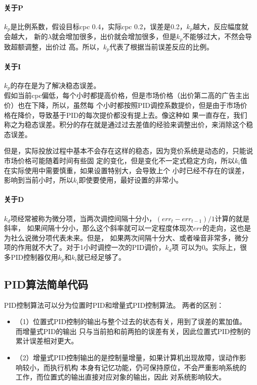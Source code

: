\paragraph{关于P}
$k_{p}$是比例系数，假设目标cpc 0.4，实际cpc 0.2，误差是0.2，$k_{p}$越大，反应幅度就会越大，
新的$\lambda$就会增加很多，出价就会增加很多，但是$k_{p}$不能够过大，不然会导致超额调整，出价过
高。所以，$k_{p}$代表了根据当前误差反应的比例。

\paragraph{关于I}
$k_{p}$的存在是为了解决稳态误差。\\
假如当前cpc偏低，每个小时都提高价格，但是市场价格（出价第二高的广告主出价）也在下降，所以，虽然每
个小时都按照PID调控系数提价，但是由于市场价格在降价，导致基于PID的每次提价都没有提上去。像这种如
果一直存在，我们称之为稳态误差。积分的存在就是通过过去差值的经验来调整出价，来消除这个稳态误差。

但是，实际投放过程中基本不会存在这样的稳态，因为竞价系统是动态的，只能说市场价格可能随着时间有些固
定的变化，但是变化不一定式稳定方向，所以$k_{i}$值在实际使用中需要慎重，如果设置特别大，会导致上个
小时已经不存在的误差，影响到当前小时，所以$k_{i}$即使要使用，最好设置的非常小。

\paragraph{关于D}
$k_{d}$项经常被称为微分项，当两次调控间隔十分小，$(err_{t} - err_{t-1})/1$计算的就是斜率，
如果间隔十分小，那么这个斜率就可以一定程度体现次$err$的走向，这也是为社么说微分项代表未来。但是，
如果两次间隔十分大、或者噪音非常多，微分项的作用就不大了。对于1小时调控一次的PID调价，$k_{d}$项
可以为0。实际上，很多PID控制器仅用$k_{p}$和$k_{i}$就已经足够了。

\subsection{PID算法简单代码}
PID控制算法可以分为位置时PID和增量式PID控制算法。
两者的区别：
\begin{itemize}
    \item （1）位置式PID控制的输出与整个过去的状态有关，用到了误差的累加值。而增量式PID的输出
    只与当前拍和前两拍的误差有关，因此位置式PID控制的累计误差相对更大。
    \item （2）增量式PID控制输出的是控制量增量，如果计算机出现故障，误动作影响较小，而执行机构
    本身有记忆功能，仍可保持原位，不会严重影响系统的工作，而位置式的输出直接对应对象的输出，因此
    对系统影响较大。
\end{itemize}

